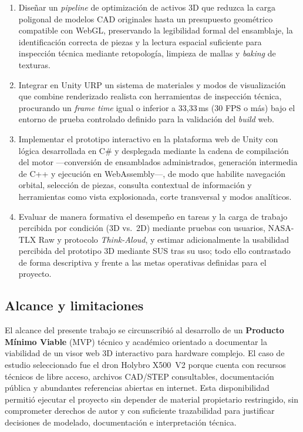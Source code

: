 \begin{enumerate}
    \item Diseñar un \textit{pipeline} de optimización de activos 3D que reduzca la carga poligonal de modelos CAD originales hasta un presupuesto geométrico compatible con WebGL, preservando la legibilidad formal del ensamblaje, la identificación correcta de piezas y la lectura espacial suficiente para inspección técnica mediante retopología, limpieza de mallas y \textit{baking} de texturas.
    \item Integrar en Unity URP un sistema de materiales y modos de visualización que combine renderizado realista con herramientas de inspección técnica, procurando un \textit{frame time} igual o inferior a 33,33\,ms (30 FPS o más) bajo el entorno de prueba controlado definido para la validación del \textit{build} web.
    \item Implementar el prototipo interactivo en la plataforma web de Unity con lógica desarrollada en C\# y desplegada mediante la cadena de compilación del motor ---conversión de ensamblados administrados, generación intermedia de C++ y ejecución en WebAssembly---, de modo que habilite navegación orbital, selección de piezas, consulta contextual de información y herramientas como vista explosionada, corte transversal y modos analíticos.
    \item Evaluar de manera formativa el desempeño en tareas y la carga de trabajo percibida por condición (3D vs.\ 2D) mediante pruebas con usuarios, NASA-TLX Raw y protocolo \textit{Think-Aloud}, y estimar adicionalmente la usabilidad percibida del prototipo 3D mediante SUS tras su uso; todo ello contrastado de forma descriptiva y frente a las metas operativas definidas para el proyecto.
\end{enumerate}

\subsection{Alcance y limitaciones}

El alcance del presente trabajo se circunscribió al desarrollo de un \textbf{Producto Mínimo Viable} (MVP) técnico y académico orientado a documentar la viabilidad de un visor web 3D interactivo para hardware complejo. El caso de estudio seleccionado fue el dron Holybro X500~V2 porque cuenta con recursos técnicos de libre acceso, archivos CAD/STEP consultables, documentación pública y abundantes referencias abiertas en internet. Esta disponibilidad permitió ejecutar el proyecto sin depender de material propietario restringido, sin comprometer derechos de autor y con suficiente trazabilidad para justificar decisiones de modelado, documentación e interpretación técnica.

